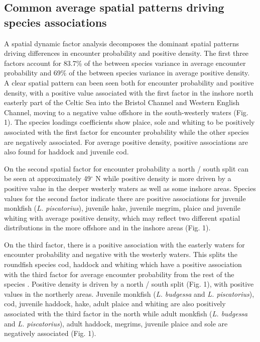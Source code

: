 \documentclass{nature}
\begin{document}
\begin{linenumbers}

\subsection{Common average spatial patterns driving species associations} A
spatial dynamic factor analysis decomposes the dominant spatial patterns
driving differences in encounter probability and positive density. The first
three factors account for 83.7\% of the between
species variance in average encounter probability and 69\% of the between
species variance in average positive density. A clear spatial pattern can been
seen both for encounter probability and positive density, with a positive value
associated with the first factor in the inshore north easterly part of the
Celtic Sea into the Bristol Channel and Western English Channel, moving to a
negative value offshore in the south-westerly waters (Fig. 1).  The species
loadings coefficients show plaice, sole and whiting to be positively associated
with the first factor for encounter probability while the other species are
negatively associated. For average positive density, positive associations are
also found for haddock and juvenile cod.  

On the second spatial factor for encounter probability a north / south split
can be seen at approximately 49$^{\circ}$ N while positive density is more
driven by a positive value in the deeper westerly waters as well as some
inshore areas. Species values for the second factor indicate there are positive
associations for juvenile monkfish (\emph{L. piscatorius}), juvenile hake,
juvenile megrim, plaice and juvenile whiting with average positive density,
which may reflect two different spatial distributions in the more offshore and
in the inshore areas (Fig. 1).

On the third factor, there is a positive association with the easterly waters
for encounter probability and negative with the westerly waters. This
 splits the
roundfish species cod, haddock and whiting which have a positive
association with the third factor for average encounter probability from the
rest of the species .  Positive
density is driven by a north / south split (Fig. 1), with positive values in
the northerly areas. Juvenile monkfish (\emph{L.  budgessa} and \emph{L.
	piscatorius}), cod, juvenile haddock, hake, adult plaice and whiting
are also positively associated with the third factor in the north while adult
monkfish (\emph{L. budgessa} and \emph{L.  piscatorius}), adult haddock,
megrims, juvenile plaice and sole are negatively associated  (Fig. 1).


\end{linenumbers}
\end{document}
